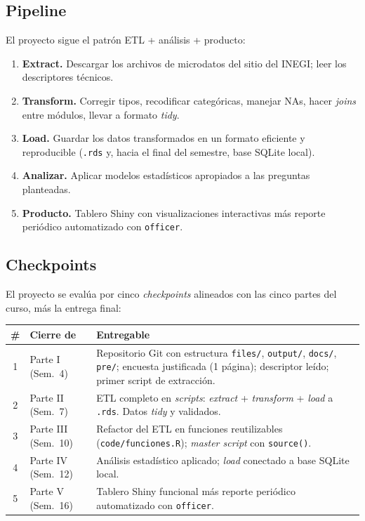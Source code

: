 \documentclass[11pt,letterpaper]{article}
\newcommand{\blue}[1]{{\color{cerulean}#1}}
\newcommand{\orange}[1]{{\color{redorange}#1}}
\begin{document}
\subsection*{Pipeline}

El proyecto sigue el patrón \orange{ETL + análisis + producto}:

\begin{enumerate}[leftmargin=*, itemsep=1pt]
    \item \textbf{Extract.} Descargar los archivos de microdatos del sitio del INEGI; leer los descriptores técnicos.
    \item \textbf{Transform.} Corregir tipos, recodificar categóricas, manejar NAs, hacer \textit{joins} entre módulos, llevar a formato \textit{tidy}.
    \item \textbf{Load.} Guardar los datos transformados en un formato eficiente y reproducible (\texttt{.rds} y, hacia el final del semestre, base SQLite local).
    \item \textbf{Analizar.} Aplicar modelos estadísticos apropiados a las preguntas planteadas.
    \item \textbf{Producto.} \blue{Tablero Shiny} con visualizaciones interactivas más \blue{reporte periódico automatizado} con \texttt{officer}.
\end{enumerate}

\subsection*{Checkpoints}

El proyecto se evalúa por cinco \textit{checkpoints} alineados con las cinco partes del curso, más la entrega final:

\begin{center}
\begin{tabular}{cp{2.6cm}p{9cm}}
\toprule
\textbf{\#} & \textbf{Cierre de} & \textbf{Entregable} \\
\midrule
1 & Parte I (Sem.\ 4)   & Repositorio Git con estructura \texttt{files/}, \texttt{output/}, \texttt{docs/}, \texttt{pre/}; encuesta justificada (1 página); descriptor leído; primer script de extracción. \\
2 & Parte II (Sem.\ 7)  & ETL completo en \textit{scripts}: \textit{extract} + \textit{transform} + \textit{load} a \texttt{.rds}. Datos \textit{tidy} y validados. \\
3 & Parte III (Sem.\ 10) & Refactor del ETL en funciones reutilizables (\texttt{code/funciones.R}); \textit{master script} con \texttt{source()}. \\
4 & Parte IV (Sem.\ 12) & Análisis estadístico aplicado; \textit{load} conectado a base SQLite local. \\
5 & Parte V (Sem.\ 16) & Tablero Shiny funcional más reporte periódico automatizado con \texttt{officer}. \\
\bottomrule
\end{tabular}
\end{center}
\end{document}
